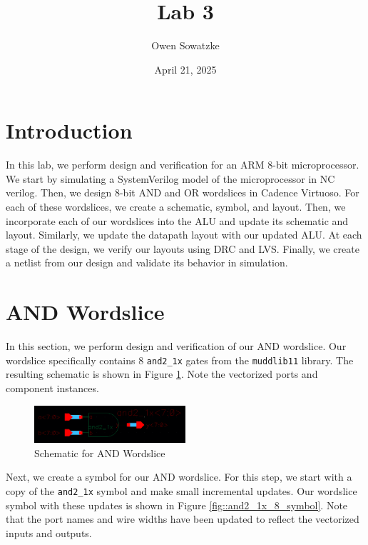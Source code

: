 \documentclass{article}
\title{Lab 3}
\author{Owen Sowatzke}
\date{April 21, 2025}
\newcommand{\zerodisplayskip}{
	\setlength{\abovedisplayskip}{0pt}%
	\setlength{\belowdisplayskip}{0pt}%
	\setlength{\abovedisplayshortskip}{0pt}%
	\setlength{\belowdisplayshortskip}{0pt}%
	\setlength{\mathindent}{0pt}}
\begin{document}
	\maketitle
	
	\section{Introduction}
	
	In this lab, we perform design and verification for an ARM 8-bit microprocessor. We start by simulating a SystemVerilog model of the microprocessor in NC verilog. Then, we design 8-bit AND and OR wordslices in Cadence Virtuoso. For each of these wordslices, we create a schematic, symbol, and layout. Then, we incorporate each of our wordslices into the ALU and update its schematic and layout. Similarly, we update the datapath layout with our updated ALU. At each stage of the design, we verify our layouts using DRC and LVS. Finally, we create a netlist from our design and validate its behavior in simulation. 
	
	\section{AND Wordslice}
	
	In this section, we perform design and verification of our AND wordslice. Our wordslice specifically contains 8 \texttt{and2\_1x} gates from the \texttt{muddlib11} library. The resulting schematic is shown in Figure \ref{fig::and2_1x_8_schematic}. Note the vectorized ports and component instances.
	
	\begin{figure}[H]
		\centerline{\includegraphics[width=0.5\textwidth]{and2_1x_8_schematic.png}}
		\caption{Schematic for AND Wordslice}
		\label{fig::and2_1x_8_schematic}
	\end{figure}
	
	\noindent Next, we create a symbol for our AND wordslice. For this step, we start with a copy of the \texttt{and2\_1x} symbol and make small incremental updates. Our wordslice symbol with these updates is shown in Figure \ref{fig::and2_1x_8_symbol}. Note that the port names and wire widths have been updated to reflect the vectorized inputs and outputs.
	
\end{document}
